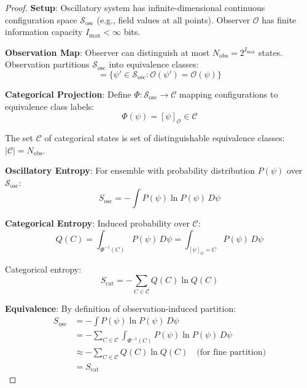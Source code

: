 \documentclass[11pt,onecolumn]{article}
\begin{document}
\begin{proof}
\textbf{Setup}: Oscillatory system has infinite-dimensional continuous configuration space $\mathcal{S}_{\text{osc}}$ (e.g., field values at all points). Observer $\mathcal{O}$ has finite information capacity $I_{\max} < \infty$ bits.

\textbf{Observation Map}: Observer can distinguish at most $N_{\text{obs}} = 2^{I_{\max}}$ states. Observation partitions $\mathcal{S}_{\text{osc}}$ into equivalence classes:
\begin{equation}
[\psi] = \{\psi' \in \mathcal{S}_{\text{osc}} : \mathcal{O}(\psi') = \mathcal{O}(\psi)\}
\end{equation}

\textbf{Categorical Projection}: Define $\Phi: \mathcal{S}_{\text{osc}} \to \mathcal{C}$ mapping configurations to equivalence class labels:
\begin{equation}
\Phi(\psi) = [\psi]_{\mathcal{O}} \in \mathcal{C}
\end{equation}

The set $\mathcal{C}$ of categorical states is set of distinguishable equivalence classes: $|\mathcal{C}| = N_{\text{obs}}$.

\textbf{Oscillatory Entropy}: For ensemble with probability distribution $P(\psi)$ over $\mathcal{S}_{\text{osc}}$:
\begin{equation}
S_{\text{osc}} = -\int P(\psi) \ln P(\psi) \, D\psi
\end{equation}

\textbf{Categorical Entropy}: Induced probability over $\mathcal{C}$:
\begin{equation}
Q(C) = \int_{\Phi^{-1}(C)} P(\psi) \, D\psi = \int_{[\psi]_{\mathcal{O}} = C} P(\psi) \, D\psi
\end{equation}

Categorical entropy:
\begin{equation}
S_{\text{cat}} = -\sum_{C \in \mathcal{C}} Q(C) \ln Q(C)
\end{equation}

\textbf{Equivalence}: By definition of observation-induced partition:
\begin{align}
S_{\text{osc}} &= -\int P(\psi) \ln P(\psi) \, D\psi \\
&= -\sum_{C \in \mathcal{C}} \int_{\Phi^{-1}(C)} P(\psi) \ln P(\psi) \, D\psi \\
&\approx -\sum_{C \in \mathcal{C}} Q(C) \ln Q(C) \quad \text{(for fine partition)} \\
&= S_{\text{cat}}
\end{align}


\end{proof}
\end{document}
